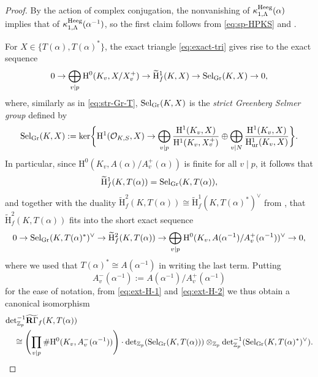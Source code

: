 \documentclass[10pt,reqno]{amsart}
\numberwithin{equation}{section}
\theoremstyle{plain}
\theoremstyle{definition}
\theoremstyle{definition}
\theoremstyle{plain}
\theoremstyle{plain}
\theoremstyle{plain}
\theoremstyle{plain}
\theoremstyle{plain}
\theoremstyle{plain}
\newcommand{\Z}{\mathbb{Z}}
\newcommand{\rH}{\mathrm{H}}
\begin{document}
\begin{proof}
By the action of complex conjugation, the nonvanishing of $\kappa_{1,\Lambda}^{\rm Heeg}(\alpha)$ implies that of $\kappa_{1,\Lambda}^{\rm Heeg}(\alpha^{-1})$, so the first claim follows from \eqref{eq:sp-HPKS}  and 
\cite[Thm.~1.6.1]{howard}.  

For $X\in\{T(\alpha),T(\alpha)^*\}$, the exact triangle \eqref{eq:exact-tri} gives rise to the exact sequence
\[
0\rightarrow\bigoplus_{v\mid p}\rH^0(K_v,X/X_v^+)\rightarrow\widetilde{\rH}^1_f(K,X)\rightarrow {\rm Sel}_{\rm Gr}(K,X)\rightarrow 0,
\]
where, similarly as in \eqref{eq:str-Gr-T}, ${\rm Sel}_{\rm Gr}(K,X)$ is the \emph{strict Greenberg Selmer group} defined by
\[
{\rm Sel}_{\rm Gr}(K,X):={\rm ker}\biggl\{\rH^1(\mathcal{O}_{K,S},X)\rightarrow\bigoplus_{v\mid p}\frac{\rH^1(K_v,X)}{\rH^1(K_v,X_v^+)}\oplus\bigoplus_{v\mid N}\frac{\rH^1(K_v,X)}{\rH^1_{\rm ur}(K_v,X)}\biggr\}.
\]
In particular, since $\rH^0(K_v,A(\alpha)/A^+_v(\alpha))$ is finite for all $v\mid p$, it follows that
\begin{equation}\label{eq:ext-H-1}
\widetilde{\rH}^1_f(K,T(\alpha))={\rm Sel}_{\rm Gr}(K,T(\alpha)),
\end{equation}
and together with the duality $\widetilde{\rH}_f^2(K,T(\alpha))\cong\widetilde{\rH}^1_f(K,T(\alpha)^*)^\vee$ from \cite[Prop.~9.7.2(i)]{nekovar-310}, that $\widetilde{\rH}_f^2(K,T(\alpha))$ fits into the short exact sequence
\begin{equation}\label{eq:ext-H-2}
0\rightarrow{\rm Sel}_{\rm Gr}(K,T(\alpha)^*)^\vee\rightarrow\widetilde{\rH}_f^2(K,T(\alpha))\rightarrow\bigoplus_{v\mid p}\rH^0(K_v,A(\alpha^{-1})/A_v^+(\alpha^{-1}))^\vee\rightarrow 0,
\end{equation}
where we used that $T(\alpha)^*\cong A(\alpha^{-1})$ in writing the last term. 
Putting 
\[
A_v^-(\alpha^{-1}):=A(\alpha^{-1})/A_v^+(\alpha^{-1})
\]
for the ease of notation, from \eqref{eq:ext-H-1} and \eqref{eq:ext-H-2} we thus obtain a canonical isomorphism
\begin{equation}\label{eq:nek-duality}
\begin{aligned}
&{\rm det}_{\Z_p}^{-1}\widetilde{\mathbf{R}\Gamma}_f(K,T(\alpha))\\
&\quad\cong\Biggl(\prod_{v\mid p}\# \rH^0(K_v,A_v^-(\alpha^{-1}))\Biggr)\cdot{\rm det}_{\Z_p}({\rm Sel}_{\rm Gr}(K,T(\alpha)))\otimes_{\Z_p}{\rm det}_{\Z_p}^{-1}({\rm Sel}_{\rm Gr}(K,T(\alpha)^*)^\vee).
\end{aligned}
\end{equation}


\end{proof}
\end{document}
